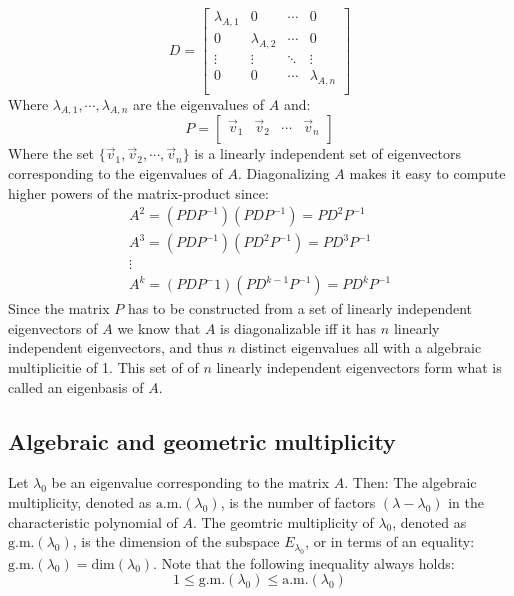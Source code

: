 \documentclass[11pt, a4paper]{article}
\newcommand*{\am}{\ensuremath{\text{a.m.}}}
\newcommand*{\gm}{\ensuremath{\text{g.m.}}}
\begin{document}
\begin{equation}
  D =
  \begin{bmatrix}
    \lambda_{A,1} & 0             & \cdots & 0\\
    0             & \lambda_{A,2} & \cdots & 0\\
    \vdots        & \vdots        & \ddots & \vdots\\
    0             & 0             & \cdots & \lambda_{A,n}\\
  \end{bmatrix}
\end{equation}
Where $\lambda_{A,1}, \cdots, \lambda_{A,n}$ are the eigenvalues of $A$ and:
\begin{equation}
  P = 
  \begin{bmatrix}
  \vec{v}_1 & \vec{v}_2 & \cdots & \vec{v}_n\\  
  \end{bmatrix}
\end{equation}
Where the set $\{\vec{v}_1, \vec{v}_2, \cdots, \vec{v}_n \}$ is a linearly independent set of eigenvectors corresponding to the eigenvalues of $A$. Diagonalizing $A$ makes it easy to compute higher powers of the matrix-product since:
\begin{gather*}
  A^2 = (PDP^{-1})(PDP^{-1}) = PD^2P^{-1}\\
  A^3 = (PDP^{-1})(PD^2P^{-1}) = PD^3P^{-1}\\
  \vdots\\
  A^k = (PDP^-1)(PD^{k-1}P^{-1}) = PD^kP^{-1}
\end{gather*}
Since the matrix $P$ has to be constructed from a set of linearly independent eigenvectors of $A$ we know that $A$ is diagonalizable iff it has $n$ linearly independent eigenvectors, and thus $n$ distinct eigenvalues all with a algebraic multiplicitie of 1. This set of of $n$ linearly independent eigenvectors form what is called an eigenbasis of $A$.


\subsection{Algebraic and geometric multiplicity}
Let $\lambda_0$ be an eigenvalue corresponding to the matrix $A$. Then: The algebraic multiplicity, denoted as $\am(\lambda_0)$, is the number of factors $(\lambda - \lambda_0)$ in the characteristic polynomial of $A$. The geomtric multiplicity of $\lambda_0$, denoted as $\gm(\lambda_0)$, is the dimension of the subspace $E_{\lambda_0}$, or in terms of an equality: $\gm(\lambda_0) = \text{dim}(\lambda_0)$. Note that the following inequality always holds:
\begin{equation}
  1 \leq \gm(\lambda_0) \leq \am(\lambda_0)
\end{equation}
\end{document}
